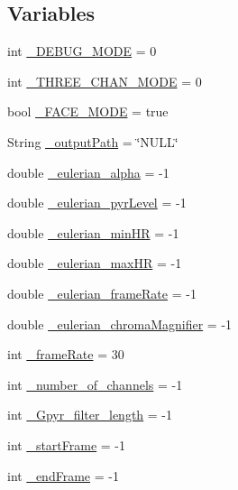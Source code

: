\subsection*{Variables}
\begin{DoxyCompactItemize}
\item 
int \hyperlink{namespace_m_h_r_a2446951af16ca1137edb21f8e07019cb}{\+\_\+\+D\+E\+B\+U\+G\+\_\+\+M\+O\+D\+E} = 0
\item 
int \hyperlink{namespace_m_h_r_a100c1e31c0fbc8c8b292064c1a8da006}{\+\_\+\+T\+H\+R\+E\+E\+\_\+\+C\+H\+A\+N\+\_\+\+M\+O\+D\+E} = 0
\item 
bool \hyperlink{namespace_m_h_r_a364268cdc7b75db63f89c9d8960aa1b4}{\+\_\+\+F\+A\+C\+E\+\_\+\+M\+O\+D\+E} = true
\item 
String \hyperlink{namespace_m_h_r_a15d81a6b22ae7616409d6df6101690eb}{\+\_\+output\+Path} = \char`\"{}N\+U\+L\+L\char`\"{}
\item 
double \hyperlink{namespace_m_h_r_abbf22419d2dbaf1d661d5b73fc9af29b}{\+\_\+eulerian\+\_\+alpha} = -\/1
\item 
double \hyperlink{namespace_m_h_r_a383bea7ba431fede0a30f05b3ae57536}{\+\_\+eulerian\+\_\+pyr\+Level} = -\/1
\item 
double \hyperlink{namespace_m_h_r_afe8a788bdd0504a98259321e41377180}{\+\_\+eulerian\+\_\+min\+H\+R} = -\/1
\item 
double \hyperlink{namespace_m_h_r_acb647c6b44ad0c7fac0fba37122d5889}{\+\_\+eulerian\+\_\+max\+H\+R} = -\/1
\item 
double \hyperlink{namespace_m_h_r_ab6b7928e4485f421869d4fbac9a5c1cd}{\+\_\+eulerian\+\_\+frame\+Rate} = -\/1
\item 
double \hyperlink{namespace_m_h_r_ad69f0161c9597e078014c52955264fd2}{\+\_\+eulerian\+\_\+chroma\+Magnifier} = -\/1
\item 
int \hyperlink{namespace_m_h_r_a8c0f2199ebe2a27a2fc0cff1daa239ee}{\+\_\+frame\+Rate} = 30
\item 
int \hyperlink{namespace_m_h_r_a2ff626868d0be78114be4abbcd0ba01b}{\+\_\+number\+\_\+of\+\_\+channels} = -\/1
\item 
int \hyperlink{namespace_m_h_r_ac3927bf3a2b93c8dc4ef19ee1a3d55f8}{\+\_\+\+Gpyr\+\_\+filter\+\_\+length} = -\/1
\item 
int \hyperlink{namespace_m_h_r_ad8b548e54d84866330d426d8edc8877e}{\+\_\+start\+Frame} = -\/1
\item 
int \hyperlink{namespace_m_h_r_a08d1602abf6cd2454b1f73a8d5523ac2}{\+\_\+end\+Frame} = -\/1
\item 

\end{DoxyCompactItemize}
